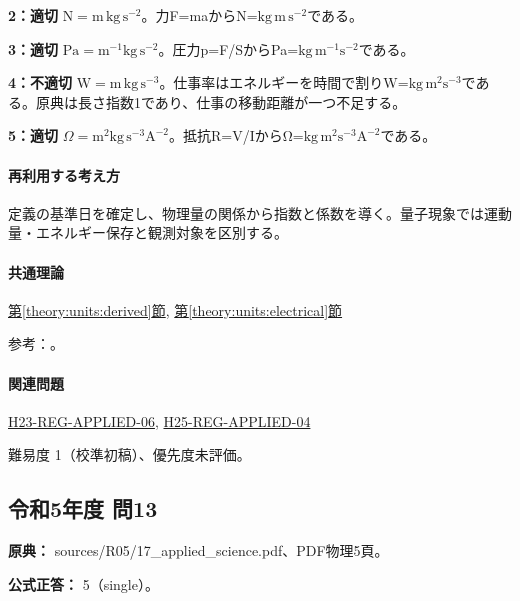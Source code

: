 \noindent\textbf{2：適切} \(\mathrm{N=m\,kg\,s^{-2}}\)。力F=\allowbreak{}maからN=\(\mathrm{kg\,m\,s^{-2}}\)である。\par

\noindent\textbf{3：適切} \(\mathrm{Pa=m^{-1}kg\,s^{-2}}\)。圧力p=\allowbreak{}F/SからPa=\(\mathrm{kg\,m^{-1}s^{-2}}\)である。\par

\noindent\textbf{4：不適切} \(\mathrm{W=m\,kg\,s^{-3}}\)。仕事率はエネルギーを時間で割りW=\(\mathrm{kg\,m^2s^{-3}}\)である。原典は長さ指数1であり、仕事の移動距離が一つ不足する。\par

\noindent\textbf{5：適切} \(\Omega=\mathrm{m^2kg\,s^{-3}A^{-2}}\)。抵抗R=\allowbreak{}V/IからΩ=\(\mathrm{kg\,m^2s^{-3}A^{-2}}\)である。\par

\paragraph{再利用する考え方} 定義の基準日を確定し、物理量の関係から指数と係数を導く。量子現象では運動量・エネルギー保存と観測対象を区別する。

\paragraph{共通理論} \hyperref[theory:units:derived]{第\ref*{theory:units:derived}節}, \hyperref[theory:units:electrical]{第\ref*{theory:units:electrical}節}

\par 参考：\cite{si_nist811,si_brochure9}。

\paragraph{関連問題} \hyperref[q:h23-reg-applied-06]{H23-REG-APPLIED-06}, \hyperref[q:h25-reg-applied-04]{H25-REG-APPLIED-04}

\par 難易度 1（校準初稿）、優先度未評価。

\subsection{令和5年度 問13}
\label{q:r05-reg-applied-13}

\noindent\textbf{原典：} sources/R05/17\_applied\_science.pdf、PDF物理5頁。

\textbf{公式正答：} 5（single）。

